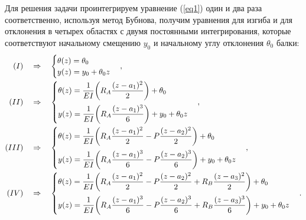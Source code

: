 \documentclass[12pt, a4paper]{article}
\begin{document}
    Для решения задачи проинтегрируем уравнение (\ref{eq1}) один и два раза соответственно, используя метод Бубнова, получим уравнения для изгиба и для отклонения в четырех областях с двумя постоянными интегрирования, которые соответствуют начальному смещению $y_{0}$ и начальному углу отклонения $\theta_{0}$ балки:
    \begin{equation}
        \begin{aligned}
            (I) \quad &\Rightarrow \quad 
            \begin{cases}
                \displaystyle \theta(z) = \theta_{0} \\
                \displaystyle y(z) = y_{0} + \theta_{0}z \\
            \end{cases}, \\
            (II) \quad &\Rightarrow \quad 
            \begin{cases}
                \displaystyle \theta(z) = \frac{1}{EI} \bigg( R_{A} \frac{(z - a_{1})^{2}}{2} \bigg) + \theta_{0} \vspace{0.2cm} \\
                \displaystyle y(z) = \frac{1}{EI} \bigg( R_{A} \frac{(z - a_{1})^{3}}{6} \bigg) + y_{0} + \theta_{0}z \\
            \end{cases}, \\
            (III) \quad &\Rightarrow \quad
            \begin{cases}
                \displaystyle \theta(z) = \frac{1}{EI} \bigg( R_{A} \frac{(z - a_{1})^{2}}{2} - P \frac{(z - a_{2})^{2}}{2} \bigg) + \theta_{0} \vspace{0.2cm} \\
                \displaystyle y(z) = \frac{1}{EI} \bigg( R_{A} \frac{(z - a_{1})^{3}}{6} - P \frac{(z - a_{2})^{3}}{6} \bigg) + y_{0} + \theta_{0}z \\
            \end{cases}, \\
            (IV) \quad &\Rightarrow \quad 
            \begin{cases}
                \displaystyle \theta(z) = \frac{1}{EI} \bigg( R_{A} \frac{(z - a_{1})^{2}}{2} - P \frac{(z - a_{2})^{2}}{2} + R_{B} \frac{(z - a_{3})^{2}}{2} \bigg) + \theta_{0} \vspace{0.2cm} \\
                \displaystyle y(z) = \frac{1}{EI} \bigg( R_{A} \frac{(z - a_{1})^{3}}{6} - P \frac{(z - a_{2})^{3}}{6} + R_{B} \frac{(z - a_{3})^{3}}{6} \bigg) + y_{0} + \theta_{0}z \\
            \end{cases}. \\
        \end{aligned}
        \label{eq3}
    \end{equation}
\end{document}

